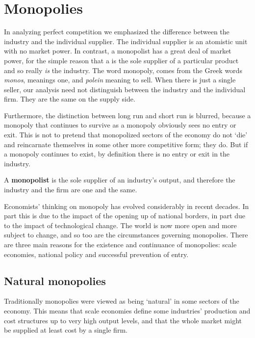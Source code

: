 \section{Monopolies}\label{sec:ch10sec1}

In analyzing perfect competition we emphasized the difference between the industry and the individual supplier. The individual supplier is an atomistic unit with no market power. In contrast, a monopolist has a great deal of market power, for the simple reason that a  is the sole supplier of a particular product and so really \textit{is} the industry. The word monopoly, comes from the Greek words \textit{monos}, meanings one, and \textit{polein} meaning to sell. When there is just a single seller, our analysis need not distinguish between the industry and the individual firm. They are the same on the supply side.

Furthermore, the distinction between long run and short run is blurred, because a monopoly that continues to survive as a monopoly obviously sees no entry or exit. This is not to pretend that monopolized sectors of the economy do not `die' and reincarnate themselves in some other more competitive form; they do. But if a monopoly continues to exist, by definition there is no entry or exit in the industry. 

\begin{DefBox}
A \textbf{monopolist} is the sole supplier of an industry's output, and therefore the industry and the firm are one and the same.
\end{DefBox}

Economists' thinking on monopoly has evolved considerably in recent decades. In part this is due to the impact of the opening up of national borders, in part due to the impact of technological change. The world is now more open and more subject to change, and so too are the circumstances governing monopolies. There are three main reasons for the existence and continuance of monopolies: scale economies, national policy and successful prevention of entry.

\subsection*{Natural monopolies}

Traditionally monopolies were viewed as being `natural' in some sectors of the economy. This means that scale economies define some industries' production and cost structures up to very high output levels, and that the whole market might be supplied at least cost by a single firm.


